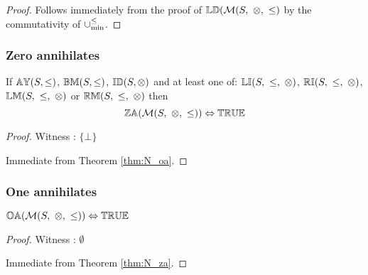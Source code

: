 \documentclass[../Summary.tex]{subfiles}
\begin{document}
\begin{proof}

\vspace{0.5em}
Follows immediately from the proof of $\propname{LD}(\mathcal{M}(S,\ \otimes,\ \leq)$ by the commutativity of $\mathbin{\cup_{\min}^{\leq}}$.
\end{proof}





\subsubsection{Zero annihilates}

\begin{theorem} \label{thm:M_za}
If ${\mathbb{AY}}(S,\leq)$, ${\mathbb{BM}}(S,\leq)$, ${\mathbb{ID}}(S,\otimes)$ and at least one of: $\propname{LI}(S,\ \leq,\ \otimes)$, $\propname{RI}(S,\ \leq,\ \otimes)$, $\propname{LM}(S,\ \leq,\ \otimes)$ or $\propname{RM}(S,\ \leq,\ \otimes)$ then
\begin{equation*}
{\mathbb{ZA}}(\mathcal{M}(S,\ \otimes,\ \leq)) \Leftrightarrow {\mathbb{TRUE}}
\end{equation*}
\end{theorem}

\begin{proof}

\vspace{0.5em}
Witness : $\{ \bot \}$

\vspace{0.5em}
Immediate from Theorem \ref{thm:N_oa}.
\end{proof}



\subsubsection{One annihilates}

\begin{theorem} \label{thm:M_oa}
${\mathbb{OA}}(\mathcal{M}(S,\ \otimes,\ \leq)) \Leftrightarrow {\mathbb{TRUE}}$
\end{theorem}

\begin{proof}

\vspace{0.5em}
Witness : $\emptyset$

\vspace{0.5em}
Immediate from Theorem \ref{thm:N_za}.
\end{proof}
\end{document}
